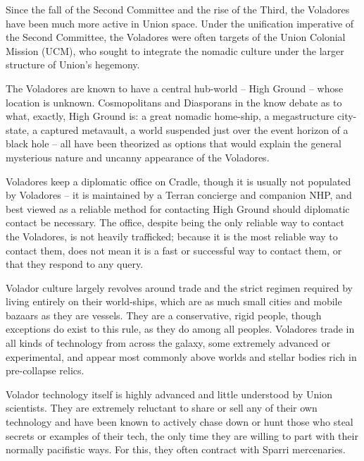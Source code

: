 Since the fall of the Second Committee and the rise of the Third, the Voladores have been much  
more active in Union space. Under the unification imperative of the Second Committee, the  
Voladores were often targets of the Union Colonial Mission (UCM), who sought to integrate the  
nomadic culture under the larger structure of Union’s hegemony.
 

The Voladores are known to have a central hub-world -- High Ground -- whose location is  
unknown. Cosmopolitans and Diasporans in the know debate as to what, exactly, High Ground  
is: a great nomadic home-ship, a megastructure city-state, a captured metavault, a world  
suspended just over the event horizon of a black hole -- all have been theorized as options that  
would explain the general mysterious nature and uncanny appearance of the Voladores. 
 

Voladores keep a diplomatic office on Cradle, though it is usually not populated by Voladores -- it  
is maintained by a Terran concierge and companion NHP, and best viewed as a reliable method  
for contacting High Ground should diplomatic contact be necessary. The office, despite being  
the only reliable way to contact the Voladores, is not heavily trafficked; because it is the most  
reliable way to contact them, does not mean it is a fast or successful way to contact them, or  
that they respond to any query. 
 

                                                                                                         


Volador culture largely revolves around trade and the strict regimen required by living entirely on  
their world-ships, which are as much small cities and mobile bazaars as they are vessels. They  
are a conservative, rigid people, though exceptions do exist to this rule, as they do among all  
peoples. Voladores trade in all kinds of technology from across the galaxy, some extremely  
advanced or experimental, and appear most commonly above worlds and stellar bodies rich in  
pre-collapse relics.
 

Volador technology itself is highly advanced and little understood by Union scientists. They are  
extremely reluctant to share or sell any of their own technology and have been known to actively  
chase down or hunt those who steal secrets or examples of their tech, the only time they are  
willing to part with their normally pacifistic ways. For this, they often contract with Sparri  
mercenaries. 
 

